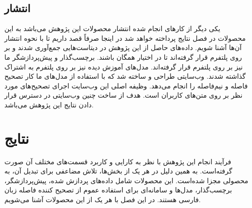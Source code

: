 \section{انتشار}
\hspace{30pt}
یکی دیگر از کارهای انجام شده انتشار محصولات این پژوهش می‌باشد به این محصولات در فصل نتایج پرداخته خواهد شد در اینجا صرفاً قصد داریم تا با نحوه انتشار آن‌ها آشنا شویم. داده‌های حاصل از این پژوهش در دیتاست‌هایی جمع‌آوری شدند و بر روی پلتفرم  قرار گرفته‌اند تا در اختیار همگان باشند. برچسب‌گذار و پیش‌پردازشگر ما نیز بر روی پلتفرم  قرار گرفته‌اند. مدل‌های آموزش دیده نیز بر روی پلتفرم   به اشتراک گذاشته شدند. وب‌سایتی طراحی و ساخته شد که با استفاده از مدل‌های ما کار تصحیح فاصله و نیم‌فاصله را انجام می‌دهد. وظیفه اصلی این وب‌سایت اجرای تصحیح‌های مورد نظر بر روی متن‌های کاربران است. هدف از ساخت چنین وب‌سایتی در دسترس قرار دادن نتایج این پژوهش می‌باشد.

\chapter{نتایج}
\hspace{30pt}
فرآیند انجام این پژوهش با نظر به کارایی و کاربرد قسمت‌های مختلف آن صورت گرفته‌است. به همین دلیل در هر یک از بخش‌ها، تلاش مضاعفی برای تبدیل آن، به محصولی مجزا شده‌است. این محصولات شامل داده‌های پردازش شده، پیش‌پردازشگر، برچسب‌گذار، مدل‌ها و سامانه‌ای برای استفاده عموم از تصحیح کننده فاصله زبان فارسی هستند. در این فصل با هر یک از این محصولات آشنا می‌شویم.

